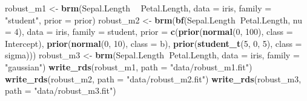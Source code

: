 \documentclass[]{book}
\newenvironment{Shaded}{\begin{snugshade}}{\end{snugshade}}
\newcommand{\DataTypeTok}[1]{\textcolor[rgb]{0.13,0.29,0.53}{#1}}
\newcommand{\DecValTok}[1]{\textcolor[rgb]{0.00,0.00,0.81}{#1}}
\newcommand{\KeywordTok}[1]{\textcolor[rgb]{0.13,0.29,0.53}{\textbf{#1}}}
\newcommand{\NormalTok}[1]{#1}
\newcommand{\OperatorTok}[1]{\textcolor[rgb]{0.81,0.36,0.00}{\textbf{#1}}}
\newcommand{\StringTok}[1]{\textcolor[rgb]{0.31,0.60,0.02}{#1}}
\begin{document}
\begin{Shaded}
\begin{Highlighting}[]
\NormalTok{robust_m1 <-}\StringTok{ }\KeywordTok{brm}\NormalTok{(Sepal.Length }\OperatorTok{~}\StringTok{ }\NormalTok{Petal.Length, }
          \DataTypeTok{data =}\NormalTok{ iris, }
          \DataTypeTok{family =} \StringTok{"student"}\NormalTok{,}
          \DataTypeTok{prior =}\NormalTok{ prior)}
\NormalTok{robust_m2 <-}\StringTok{ }\KeywordTok{brm}\NormalTok{(}\KeywordTok{bf}\NormalTok{(Sepal.Length}\OperatorTok{~}\NormalTok{Petal.Length, }\DataTypeTok{nu =} \DecValTok{4}\NormalTok{),}
          \DataTypeTok{data =}\NormalTok{ iris, }
          \DataTypeTok{family =}\NormalTok{ student,}
          \DataTypeTok{prior =} \KeywordTok{c}\NormalTok{(}\KeywordTok{prior}\NormalTok{(}\KeywordTok{normal}\NormalTok{(}\DecValTok{0}\NormalTok{, }\DecValTok{100}\NormalTok{), }\DataTypeTok{class =}\NormalTok{ Intercept),}
                \KeywordTok{prior}\NormalTok{(}\KeywordTok{normal}\NormalTok{(}\DecValTok{0}\NormalTok{, }\DecValTok{10}\NormalTok{),  }\DataTypeTok{class =}\NormalTok{ b),}
                \KeywordTok{prior}\NormalTok{(}\KeywordTok{student_t}\NormalTok{(}\DecValTok{5}\NormalTok{, }\DecValTok{0}\NormalTok{, }\DecValTok{5}\NormalTok{),   }\DataTypeTok{class =}\NormalTok{ sigma)))}
\NormalTok{robust_m3 <-}\StringTok{ }\KeywordTok{brm}\NormalTok{(Sepal.Length}\OperatorTok{~}\NormalTok{Petal.Length, }
          \DataTypeTok{data =}\NormalTok{ iris, }
          \DataTypeTok{family =} \StringTok{"gaussian"}\NormalTok{)}
\KeywordTok{write_rds}\NormalTok{(robust_m1, }\DataTypeTok{path =} \StringTok{"data/robust_m1.fit"}\NormalTok{)}
\KeywordTok{write_rds}\NormalTok{(robust_m2, }\DataTypeTok{path =} \StringTok{"data/robust_m2.fit"}\NormalTok{)}
\KeywordTok{write_rds}\NormalTok{(robust_m3, }\DataTypeTok{path =} \StringTok{"data/robust_m3.fit"}\NormalTok{)}
\end{Highlighting}
\end{Shaded}
\end{document}
